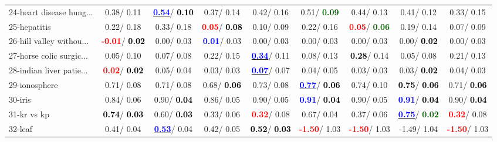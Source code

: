\begin{table}[h]
\begin{center}
\begin{tabular}{lc|c|c|c|c|c|c|c}
24-heart disease hung... &   0.38/  0.11 & \underline{\textcolor{blue}{\textbf{  0.54}}}/\textcolor{black}{\textbf{  0.10}} &   0.37/  0.14 &   0.42/  0.16 &   0.51/\textcolor{darkgreen}{\textbf{  0.09}} &   0.44/  0.13 &   0.41/  0.12 &   0.33/  0.15 \\
25-hepatitis &   0.22/  0.18 &   0.33/  0.18 & \textcolor{red}{\textbf{  0.05}}/\textcolor{black}{\textbf{  0.08}} &   0.10/  0.09 &   0.22/  0.16 & \textcolor{red}{\textbf{  0.05}}/\textcolor{darkgreen}{\textbf{  0.06}} &   0.19/  0.14 &   0.07/  0.09 \\
26-hill valley withou... & \textcolor{red}{\textbf{ -0.01}}/\textcolor{black}{\textbf{  0.02}} &   0.00/  0.03 & \textcolor{blue}{\textbf{  0.01}}/  0.03 &   0.00/  0.03 &   0.00/  0.03 &   0.00/  0.03 &   0.00/\textcolor{black}{\textbf{  0.02}} &   0.00/  0.03 \\
27-horse colic surgic... &   0.05/  0.10 &   0.07/  0.08 &   0.22/  0.15 & \underline{\textcolor{blue}{\textbf{  0.34}}}/  0.11 &   0.08/  0.13 & \textcolor{black}{\textbf{  0.28}}/  0.14 &   0.05/  0.08 &   0.21/  0.13 \\
28-indian liver patie... & \textcolor{red}{\textbf{  0.02}}/\textcolor{black}{\textbf{  0.02}} &   0.05/  0.04 &   0.03/  0.03 & \underline{\textcolor{blue}{\textbf{  0.07}}}/  0.07 &   0.04/  0.05 &   0.03/  0.03 &   0.03/\textcolor{black}{\textbf{  0.02}} &   0.04/  0.03 \\ \hline
29-ionosphere &   0.71/  0.08 &   0.71/  0.08 &   0.68/\textcolor{black}{\textbf{  0.06}} &   0.73/  0.08 & \underline{\textcolor{blue}{\textbf{  0.77}}}/\textcolor{black}{\textbf{  0.06}} &   0.74/  0.10 & \textcolor{black}{\textbf{  0.75}}/\textcolor{black}{\textbf{  0.06}} &   0.71/\textcolor{black}{\textbf{  0.06}} \\
30-iris &   0.84/  0.06 &   0.90/\textcolor{black}{\textbf{  0.04}} &   0.86/  0.05 &   0.90/  0.05 & \textcolor{blue}{\textbf{  0.91}}/\textcolor{black}{\textbf{  0.04}} &   0.90/  0.05 & \textcolor{blue}{\textbf{  0.91}}/\textcolor{black}{\textbf{  0.04}} &   0.90/\textcolor{black}{\textbf{  0.04}} \\
31-kr vs kp & \textcolor{black}{\textbf{  0.74}}/\textcolor{black}{\textbf{  0.03}} &   0.60/\textcolor{black}{\textbf{  0.03}} &   0.33/  0.06 & \textcolor{red}{\textbf{  0.32}}/  0.08 &   0.67/  0.04 &   0.37/  0.06 & \underline{\textcolor{blue}{\textbf{  0.75}}}/\textcolor{darkgreen}{\textbf{  0.02}} & \textcolor{red}{\textbf{  0.32}}/  0.08 \\
32-leaf &   0.41/  0.04 & \underline{\textcolor{blue}{\textbf{  0.53}}}/  0.04 &   0.42/  0.05 & \textcolor{black}{\textbf{  0.52}}/\textcolor{black}{\textbf{  0.03}} & \textcolor{red}{\textbf{ -1.50}}/  1.03 & \textcolor{red}{\textbf{ -1.50}}/  1.03 &  -1.49/  1.04 & \textcolor{red}{\textbf{ -1.50}}/  1.03 \\\end{tabular}\label{stratsALCKappa0bVFDT}
\end{center}
\end{table}
